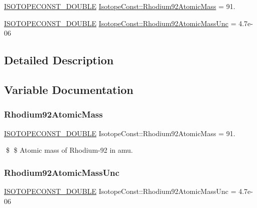 \begin{DoxyCompactItemize}
\item 
\mbox{\hyperlink{group___isotope_const-_macros_ga8f45a7272ce02c0b4c65c44636ed719a}{I\+S\+O\+T\+O\+P\+E\+C\+O\+N\+S\+T\+\_\+\+D\+O\+U\+B\+LE}} \mbox{\hyperlink{group___isotope_const-_rhodium-_rh92_gad0a725a140e9ee3abf1fc8a622878eed}{Isotope\+Const\+::\+Rhodium92\+Atomic\+Mass}} = 91.
\item 
\mbox{\hyperlink{group___isotope_const-_macros_ga8f45a7272ce02c0b4c65c44636ed719a}{I\+S\+O\+T\+O\+P\+E\+C\+O\+N\+S\+T\+\_\+\+D\+O\+U\+B\+LE}} \mbox{\hyperlink{group___isotope_const-_rhodium-_rh92_gac3d78bd3b9cc269fe57b5fc35106e376}{Isotope\+Const\+::\+Rhodium92\+Atomic\+Mass\+Unc}} = 4.\+7e-\/06
\end{DoxyCompactItemize}


\subsection{Detailed Description}


\subsection{Variable Documentation}
\mbox{\label{group___isotope_const-_rhodium-_rh92_gad0a725a140e9ee3abf1fc8a622878eed}} 
\subsubsection{\texorpdfstring{Rhodium92\+Atomic\+Mass}{Rhodium92AtomicMass}}
{\footnotesize\ttfamily \mbox{\hyperlink{group___isotope_const-_macros_ga8f45a7272ce02c0b4c65c44636ed719a}{I\+S\+O\+T\+O\+P\+E\+C\+O\+N\+S\+T\+\_\+\+D\+O\+U\+B\+LE}} Isotope\+Const\+::\+Rhodium92\+Atomic\+Mass = 91.}

\$ \$ Atomic mass of Rhodium-\/92 in amu. \mbox{\label{group___isotope_const-_rhodium-_rh92_gac3d78bd3b9cc269fe57b5fc35106e376}} 
\subsubsection{\texorpdfstring{Rhodium92\+Atomic\+Mass\+Unc}{Rhodium92AtomicMassUnc}}
{\footnotesize\ttfamily \mbox{\hyperlink{group___isotope_const-_macros_ga8f45a7272ce02c0b4c65c44636ed719a}{I\+S\+O\+T\+O\+P\+E\+C\+O\+N\+S\+T\+\_\+\+D\+O\+U\+B\+LE}} Isotope\+Const\+::\+Rhodium92\+Atomic\+Mass\+Unc = 4.\+7e-\/06}


